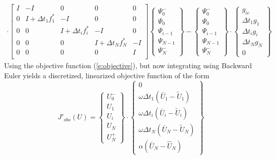 \documentclass[10pt]{article}
\begin{document}
\begin{eqnarray}
\cdot
\left[ \begin{array}{ccccc} 
I & -I & 0 & 0 & 0 \\
0 & I + \Delta t_1 f^*_1 & -I & 0 & 0 \\
0 & 0 & I + \Delta t_i f^*_i & -I & 0 \\
0 & 0 & 0 & I + \Delta t_N f^*_N & -I \\
0 & 0 & 0 & 0 & I \\
\end{array} \right] 
\left\{\begin{array}{c} 
\Psi_0^- \\ \Psi_0 \\ \Psi_{i-1} \\ \Psi_{N-1} \\ \Psi_N^- 
\end{array}\right\}
-
\left\{\begin{array}{c} 
\Psi_0^- \\ \Psi_0 \\ \Psi_{i-1} \\ \Psi_{N-1} \\ \Psi_N^- 
\end{array}\right\}
\cdot
\left\{\begin{array}{c} g_{ic} \\ \Delta t_1 g_1 \\ \Delta t_i g_i \\ 
\Delta t_N g_N \\ 0 
\end{array} \right\} &
\end{eqnarray}
Using the objective function (\ref{e:objective}), but now integrating using
Backward Euler yields a discretized, linearized objective function of the form
\begin{equation}
J'_{obs}(U) = 
\left\{\begin{array}{c} U_0^- \\ U_1 \\ U_i \\ U_N \\ U^+_N \end{array}\right\}
\cdot
\left\{\begin{array}{c} 
0 \\
\omega\Delta t_1(\bar U_1 - \tilde U_1) \\ 
\omega\Delta t_i(\bar U_i - \tilde U_i) \\ 
\omega\Delta t_N(\bar U_N - \tilde U_N) \\
\alpha (\bar U_N - \hat U_N)
\end{array}\right\}
\end{equation}
\end{document}
